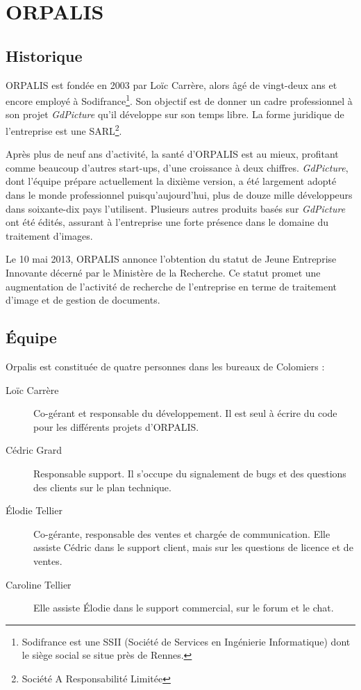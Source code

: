 \chapter{ORPALIS}

\section{Historique}

ORPALIS est fondée en 2003 par Loïc Carrère, alors âgé de vingt-deux ans et encore employé à Sodifrance\footnote{Sodifrance est une SSII (Société de Services en Ingénierie Informatique) dont le siège social se situe près de Rennes.}. Son objectif est de donner un cadre professionnel à son projet \emph{GdPicture} qu'il développe sur son temps libre. La forme juridique de l'entreprise est une SARL\footnote{Société A Responsabilité Limitée}. 

Après plus de neuf ans d'activité, la santé d'ORPALIS est au mieux, profitant comme beaucoup d'autres start-ups, d'une croissance à deux chiffres. \emph{GdPicture}, dont l'équipe prépare actuellement la dixième version, a été largement adopté dans le monde professionnel puisqu'aujourd'hui, plus de douze mille développeurs dans soixante-dix pays l'utilisent. Plusieurs autres produits basés sur \emph{GdPicture} ont été édités, assurant à l'entreprise une forte présence dans le domaine du traitement d'images.

Le 10 mai 2013, ORPALIS annonce l'obtention du statut de Jeune Entreprise Innovante décerné par le Ministère de la Recherche. Ce statut promet une augmentation de l'activité de recherche de l'entreprise en terme de traitement d'image et de gestion de documents.

\section{Équipe}

Orpalis est constituée de quatre personnes dans les bureaux de Colomiers :

\begin{description}
\item[Loïc Carrère] Co-gérant et responsable du développement. Il est seul à écrire du code pour les différents projets d'ORPALIS. 
\item[Cédric Grard] Responsable support. Il s'occupe du signalement de bugs et des questions des clients sur le plan technique.
\item[\'{E}lodie Tellier] Co-gérante, responsable des ventes et chargée de communication. Elle assiste Cédric dans le support client, mais sur les questions de licence et de ventes.
\item[Caroline Tellier] Elle assiste \'{E}lodie dans le support commercial, sur le forum et le chat.
\end{description}

